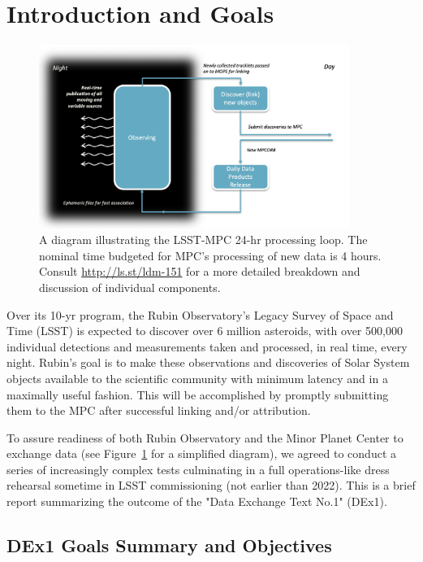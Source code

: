 \section{Introduction and Goals}

\begin{figure}
	\centering
	\includegraphics[width=0.9\textwidth]{mpc-loop.jpg}
	\caption{A diagram illustrating the LSST-MPC 24-hr processing loop. The nominal time budgeted for MPC's processing of new data is 4 hours. Consult \url{http://ls.st/ldm-151} for a more detailed breakdown and discussion of individual components.}
	\label{fig:loop}
\end{figure}

Over its 10-yr program, the Rubin Observatory's Legacy Survey of Space and Time (LSST) is expected to discover over 6 million asteroids, with over 500,000 individual detections and measurements taken and processed, in real time, every night. Rubin's goal is to make these observations and discoveries of Solar System objects available to the scientific community with minimum latency and in a maximally useful fashion. This will be accomplished by promptly submitting them to the MPC after successful linking and/or attribution.

To assure readiness of both Rubin Observatory and the Minor Planet Center to exchange data (see Figure~\ref{fig:loop} for a simplified diagram), we agreed to conduct a series of increasingly complex tests culminating in a full operations-like dress rehearsal sometime in LSST commissioning (not earlier than 2022). This is a brief report summarizing the outcome of the "Data Exchange Text No.1" (DEx1).

\subsection{DEx1 Goals Summary and Objectives}

